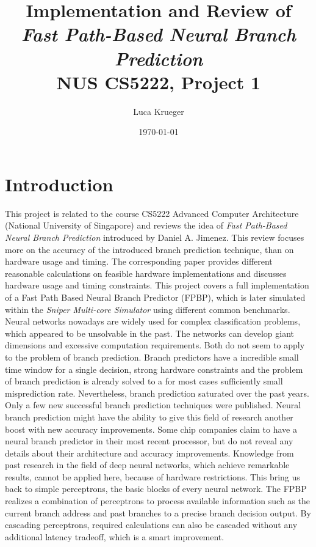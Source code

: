 \documentclass{article}
\title{Implementation and Review of \\ \textit{Fast Path-Based Neural Branch Prediction\cite{fastpath}}\\ NUS CS5222, Project 1}
\author{Luca Krueger}
\date{\today}
\begin{document}
\maketitle

\section{Introduction}
This project is related to the course CS5222 Advanced Computer Architecture (National University of Singapore) and reviews the idea of \emph{Fast Path-Based Neural Branch Prediction\cite{fastpath}} introduced by Daniel A. Jimenez. 
This review focuses more on the accuracy of the introduced branch prediction technique, than on hardware usage and timing. The corresponding paper provides different reasonable calculations on feasible hardware implementations and discusses hardware usage and timing constraints. 
This project covers a full implementation of a Fast Path Based Neural Branch Predictor (FPBP), which is later simulated within the \emph{Sniper Multi-core Simulator\cite{carlson2014aeohmcm}} using different common benchmarks.
Neural networks nowadays are widely used for complex classification problems, which appeared to be unsolvable in the past. The networks can develop giant dimensions and excessive computation requirements. Both do not seem to apply to the problem of branch prediction. Branch predictors have a incredible small time window for a single decision, strong hardware constraints and the problem of branch prediction is already solved to a for most cases sufficiently small misprediction rate. 
Nevertheless, branch prediction saturated over the past years. Only a few new successful branch prediction techniques were published. 
Neural branch prediction might have the ability to give this field of research another boost with new accuracy improvements. Some chip companies claim to have a neural branch predictor in their most recent processor, but do not reveal any details about their architecture and accuracy improvements.
Knowledge from past research in the field of deep neural networks, which achieve remarkable results, cannot be applied here, because of hardware restrictions. This bring us back to simple perceptrons, the basic blocks of every neural network.
The FPBP realizes a combination of perceptrons to process available information such as the current branch address and past branches to a precise branch decision output. By cascading perceptrons, required calculations can also be cascaded without any additional latency tradeoff, which is a smart improvement.
\end{document}
